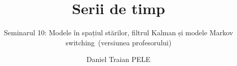 \title[Serii de timp]{Serii de timp}
\subtitle{Seminarul 10: Modele în spațiul stărilor, filtrul Kalman și modele Markov switching\ifsolutions\ (versiunea profesorului)\fi}
\author[D.T. Pele]{Daniel Traian PELE}
\date{}

\providecommand{\tsaapplink}[3]{\hypertarget{#2}{}\hyperlink{#1}{\beamergotobutton{#3}}}  %
\providecommand{\tsaappback}[2]{\begin{tikzpicture}[remember picture,overlay]\node[anchor=south east] at ([xshift=-3mm,yshift=7mm]current page.south east){\hyperlink{#1}{\beamerreturnbutton{#2}}};\end{tikzpicture}}  %
\providecommand{\tsachlink}[2]{\href{#1}{#2}}  %
\providecommand{\tsachlinkt}[2]{\href{#1}{\usebeamercolor[fg]{frametitle}#2}}  %


